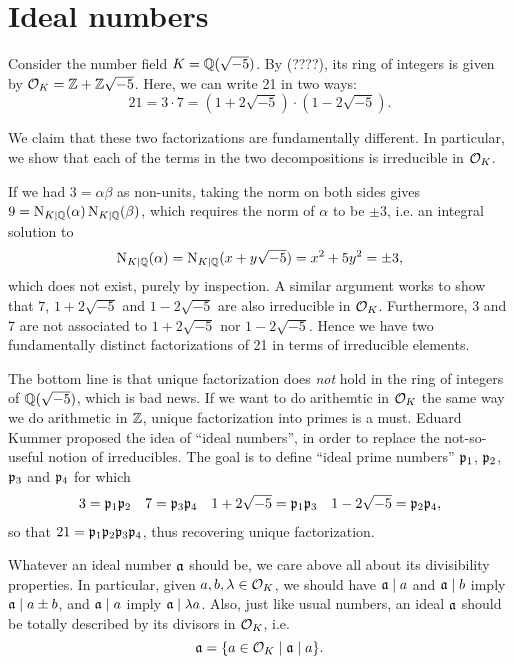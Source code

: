 \section{Ideal numbers}

Consider the number field $K=\mathbb{Q}(\sqrt{-5})$. By (????), its ring of integers is given by $\mathcal{O}_K=\mathbb{Z}+\mathbb{Z}\sqrt{-5}$. Here, we can write 21 in two ways:
\[
	21 = 3\cdot 7 = (1+2\sqrt{-5})\cdot(1-2\sqrt{-5}).
\]

We claim that these two factorizations are fundamentally different. In particular, we show that each of the terms in the two decompositions is irreducible in $\mathcal{O}_K$.

If we had $3=\alpha\beta$ as non-units, taking the norm on both sides gives $9=\operatorname{N}_{K\mid\mathbb{Q}}(\alpha)\operatorname{N}_{K\mid\mathbb{Q}}(\beta)$, which requires the norm of $\alpha$ to be $\pm 3$, i.e. an integral solution to
\[
	\operatorname{N}_{K\mid\mathbb{Q}}(\alpha) = \operatorname{N}_{K\mid\mathbb{Q}}(x + y\sqrt{-5}) = x^2 +5y^2 = \pm 3,
\]
which does not exist, purely by inspection. A similar argument works to show that $7$, $1+2\sqrt{-5}$ and $1-2\sqrt{-5}$ are also irreducible in $\mathcal{O}_K$. Furthermore, 3 and 7 are not associated to $1+2\sqrt{-5}$ nor $1-2\sqrt{-5}$. Hence we have two fundamentally distinct factorizations of 21 in terms of irreducible elements.

The bottom line is that unique factorization does \emph{not} hold in the ring of integers of $\mathbb{Q}(\sqrt{-5})$, which is bad news. If we want to do arithemtic in $\mathcal{O}_K$ the same way we do arithmetic in $\mathbb{Z}$, unique factorization into primes is a must. Eduard Kummer proposed the idea of ``ideal numbers'', in order to replace the not-so-useful notion of  irreducibles. The goal is to define ``ideal prime numbers'' $\mathfrak{p}_1$, $\mathfrak{p}_2$, $\mathfrak{p}_3$ and $\mathfrak{p}_4$ for which
\begin{align*}
	3 = \mathfrak{p}_1\mathfrak{p}_2 && 7 = \mathfrak{p}_3\mathfrak{p}_4 && 1+2\sqrt{-5} = \mathfrak{p}_1\mathfrak{p}_3 && 1-2\sqrt{-5} = \mathfrak{p}_2\mathfrak{p}_4,
\end{align*}
so that $21 = \mathfrak{p}_1\mathfrak{p}_2\mathfrak{p}_3\mathfrak{p}_4$, thus recovering unique factorization.

Whatever an ideal number $\mathfrak{a}$ should be, we care above all about its divisibility properties. In particular, given $a,b,\lambda\in\mathcal{O}_K$, we should have $\mathfrak{a}\mid a$ and $\mathfrak{a}\mid b$ imply $\mathfrak{a}\mid a\pm b$, and $\mathfrak{a}\mid a$ imply $\mathfrak{a}\mid\lambda a$. Also, just like usual numbers, an ideal $\mathfrak{a}$ should be totally described by its divisors in $\mathcal{O}_K$, i.e.
\[
	\mathfrak{a} = \{a\in\mathcal{O}_K\mid\mathfrak{a}\mid a\}.
\]


